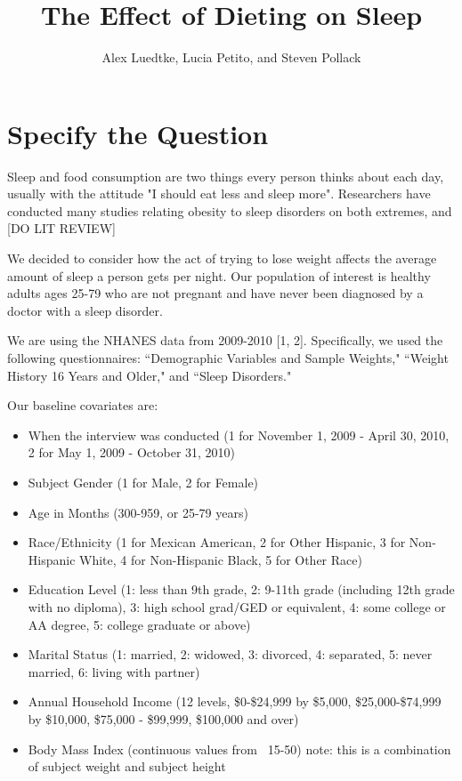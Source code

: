 \documentclass{article}
\begin{document}




\title{\textbf{The Effect of Dieting on Sleep}}
\author{Alex Luedtke, Lucia Petito, and Steven Pollack}
\date{}
\maketitle

\section{Specify the Question}

Sleep and food consumption are two things every person thinks about each day, usually with the attitude "I should eat less and sleep more".  Researchers have conducted many studies relating obesity to sleep disorders on both extremes, and [DO LIT REVIEW]

We decided to consider how the act of trying to lose weight affects the average amount of sleep a person gets per night.  Our population of interest is healthy adults ages 25-79 who are not pregnant and have never been diagnosed by a doctor with a sleep disorder.  

We are using the NHANES data from 2009-2010 [1, 2].  Specifically, we used the following questionnaires: ``Demographic Variables and Sample Weights," ``Weight History 16 Years and Older," and ``Sleep Disorders."

Our baseline covariates are:
\begin{itemize}
\item When the interview was conducted (1 for November 1, 2009 - April 30, 2010, 2 for May 1, 2009 - October 31, 2010)
\item Subject Gender (1 for Male, 2 for Female)
\item Age in Months (300-959, or 25-79 years)
\item Race/Ethnicity (1 for Mexican American, 2 for Other Hispanic, 3 for Non-Hispanic White, 4 for Non-Hispanic Black, 5 for Other Race)
\item Education Level (1: less than 9th grade, 2: 9-11th grade (including 12th grade with no diploma), 3: high school grad/GED or equivalent, 4: some college or AA degree, 5: college graduate or above)
\item Marital Status (1: married, 2: widowed, 3: divorced, 4: separated, 5: never married, 6: living with partner)
\item Annual Household Income (12 levels, \$0-\$24,999 by \$5,000, \$25,000-\$74,999 by \$10,000,  \$75,000 - \$99,999, \$100,000 and over)
\item Body Mass Index (continuous values from ~15-50) note: this is a combination of subject weight and subject height
\end{itemize}
\end{document}
